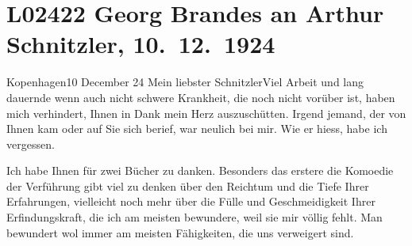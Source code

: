 

\section[Georg Brandes an Arthur Schnitzler, 10. 12. 1924]{L02422 Georg Brandes an Arthur Schnitzler, 10. 12. 1924}
\nopagebreak{}
\rehead{ }\normalsize\beginnumbering{}
\toendnotes[C]{\smallbreak\pagebreak[2]}
\toendnotes[C]{\smallbreak}
\pstart
           \raggedleft{}{\pb}Kopenhagen10 December 24\pend
           \vspace{0.5em}
\pstart
           Mein liebster Schnitzler\hspace*{3.5em}Viel Arbeit und lang dauernde wenn auch nicht
               schwere Krankheit, die noch nicht vorüber ist, haben mich verhindert, Ihnen in Dank
               mein Herz auszuschütten. Irgend jemand, der von Ihnen kam oder auf Sie sich berief,
               war neulich bei mir. Wie er hiess, habe ich vergessen.\pend
           
\pstart
           Ich habe Ihnen für zwei Bücher zu danken. Besonders das erstere die Komoedie der Verführung gibt viel zu denken über den Reichtum und die Tiefe
               Ihrer Erfahrungen, vielleicht noch mehr über die Fülle und Geschmeidigkeit Ihrer
               Erfindungskraft, die ich am meisten bewundere, weil sie mir völlig fehlt. Man
               bewundert {\pb}wol immer am meisten
               Fähigkeiten, die uns verweigert sind.\pend
           
